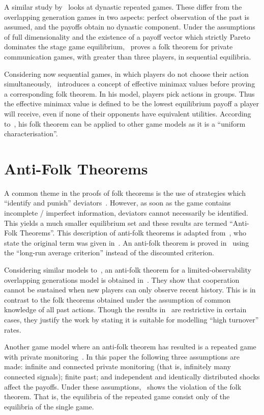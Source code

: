 A similar study by~\cite{Anderlini2008} looks at dynastic repeated games. These
differ from the overlapping generation games in two aspects: perfect observation
of the past is assumed, and the payoffs obtain no dynastic component. Under the
assumptions of full dimensionality and the existence of a payoff vector which
strictly Pareto dominates the stage game equilibrium,~\cite{Anderlini2008}
proves a folk theorem for private communication games, with greater than three
players, in sequential equilibria.

Considering now sequential games, in which players do not choose their action
simultaneously,~\cite{Wen2002} introduces a concept of effective minimax values
before proving a corresponding folk theorem. In his model, players pick actions
in groups. Thus the effective minimax value is defined to be the lowest
equilibrium payoff a player will receive, even if none of their opponents have
equivalent utilities. According to~\cite{Wen2002}, his folk theorem can be
applied to other game models as it is a ``uniform characterisation''.


\section{Anti-Folk Theorems}\label{sec:Anti-Folk_Theorems}
A common theme in the proofs of folk theorems is the use of strategies which
``identify and punish'' deviators~\cite{Masso1989}. However, as soon as the game
contains incomplete / imperfect information, deviators cannot necessarily be
identified. This yields a much smaller equilibrium set and these results are
termed ``Anti-Folk Theorems''. This description of anti-folk theorems is adapted
from~\cite{Masso1989}, who state the original term was given
in~\cite{Dubey1984,Kaneko1982}. An anti-folk theorem is proved
in~\cite{Masso1989} using the ``long-run average criterion'' instead of the
discounted criterion.

Considering similar models to~\cite{Bhaskar1998, Gossner1996}, an anti-folk theorem for a limited-observability overlapping generations
model is obtained in~\cite{Yoon2001}. They show that cooperation cannot be
sustained when new players can only observe recent history. This is in contrast
to the folk theorems obtained under
the assumption of common knowledge of all past actions. Though the results
in~\cite{Yoon2001} are
restrictive in certain cases, they justify the work by stating it is suitable
for modelling ``high turnover'' rates.

Another game model where an anti-folk theorem has resulted is a repeated game
with private monitoring~\cite{Peski2012}. In this paper the following
three assumptions are made: infinite and connected private monitoring (that is,
infinitely many connected signals); finite past; and independent and identically
distributed shocks affect the payoffs. Under these assumptions,~\cite{Peski2012}
shows the violation of the folk theorem. That is, the equilibria of the repeated
game consist only of the equilibria of the single game.


